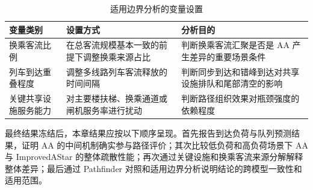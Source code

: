 \documentclass[UTF8,a4paper,12pt]{ctexart}
\begin{document}
\begin{table}[htbp]
\centering
\caption{适用边界分析的变量设置}
\small
\begin{tabular}{p{}p{}p{}}
\toprule
变量类别 & 设置方式 & 分析目的 \\
\midrule
换乘客流比例 & 在总客流规模基本一致的前提下调整换乘来源占比 & 判断换乘客流汇聚是否是 AA 产生差异的重要场景条件 \\
列车到达重叠程度 & 调整多线路列车客流释放的时间间隔 & 判断同步到达和错峰到达对共享设施排队和尾部清空的影响 \\
关键共享设施服务能力 & 对主要楼扶梯、换乘通道或闸机服务率进行扰动 & 判断路径组织效果对瓶颈强度的依赖程度 \\
\bottomrule
\end{tabular}
\end{table}

最终结果冻结后，本章结果应按以下顺序呈现。首先报告到达负荷与队列预测结果，证明 AA 的中间机制确实参与路径评价；其次比较低负荷和高负荷场景下 AA 与 ImprovedAStar 的整体疏散性能；再次通过关键设施和换乘客流来源分解解释整体差异；最后通过 Pathfinder 对照和适用边界分析说明结论的跨模型一致性和适用范围。
\end{document}
